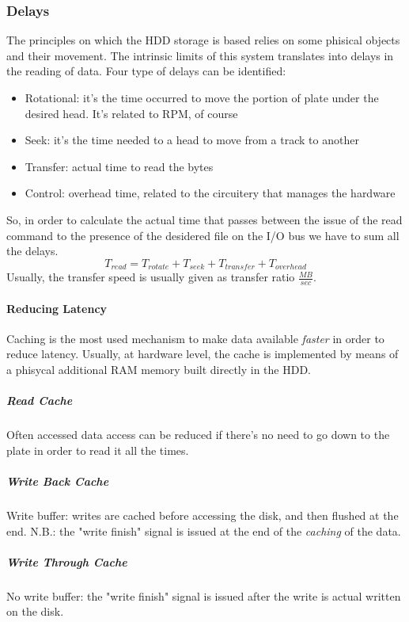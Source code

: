 \documentclass[10pt,a4paper]{article}
\begin{document}
				\subsubsection{Delays}
					The principles on which the HDD storage is based relies on some phisical objects and their movement. The intrinsic limits of this system translates into delays in the reading of data. Four type of delays can be identified:
					\begin{itemize}
						\item Rotational: it's the time occurred to move the portion of plate under the desired head. It's related to RPM, of course
						\item Seek: it's the time needed to a head to move from a track to another
						\item Transfer: actual time to read the bytes
						\item Control: overhead time, related to the circuitery that manages the hardware
					\end{itemize}
					
					So, in order to calculate the actual time that passes between the issue of the read command to the presence of the desidered file on the I/O bus we have to sum all the delays.
					\begin{equation}
						T_{read} = T_{rotate} + T_{seek} + T_{transfer} + T_{overhead}
					\end{equation}
					Usually, the transfer speed is usually given as transfer ratio $\frac{MB}{sec}$. 
					
					\paragraph{Reducing Latency}
						Caching is the most used mechanism to make data available \emph{faster} in order to reduce latency. Usually, at hardware level, the cache is implemented by means of a phisycal additional RAM memory built directly in the HDD.
						
						\subparagraph{Read Cache}
							Often accessed data access can be reduced if there's no need to go down to the plate in order to read it all the times.
						
						\subparagraph{Write Back Cache}
							Write buffer: writes are cached before accessing the disk, and then flushed at the end. N.B.: the "write finish" signal is issued at the end of the \emph{caching} of the data.
							
						\subparagraph{Write Through Cache}
							No write buffer: the "write finish" signal is issued after the write is actual written on the disk.
							
\end{document}
